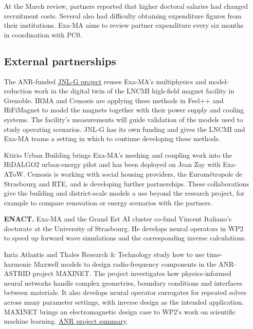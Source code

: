 At the March review, partners reported that higher doctoral salaries
had changed recruitment costs. Several also had difficulty obtaining
expenditure figures from their institutions. Exa-MA aims to review
partner expenditure every six months in coordination with PC0.

\subsection{External partnerships}

The ANR-funded \href{https://anr.fr/Project-ANR-25-CE46-1157}{JNL-G project}
reuses Exa-MA's multiphysics and model-reduction work in the digital
twin of the LNCMI high-field magnet facility in Grenoble. IRMA and
Cemosis are applying these methods in Feel++ and HiFiMagnet to model
the magnets together with their power supply and cooling systems.
The facility's measurements will guide validation of the models used
to study operating scenarios. JNL-G has its own funding and gives the
LNCMI and Exa-MA teams a setting in which to continue developing these methods.

Ktirio Urban Building brings Exa-MA's meshing and coupling work into
the HiDALGO2 urban-energy pilot and has been deployed on Jean Zay with
Exa-AToW. Cemosis is working with social housing providers, the
Eurométropole de Strasbourg and RTE, and is developing further
partnerships. These collaborations give the building and district-scale
models a use beyond the research project, for example to compare
renovation or energy scenarios with the partners.

\textbf{ENACT.} Exa-MA and the Grand Est AI cluster co-fund Vincent Italiano's
doctorate at the University of Strasbourg. He develops neural operators in WP2
to speed up forward wave simulations and the corresponding inverse calculations.

Inria Atlantis and Thales Research \& Technology study how to use
time-harmonic Maxwell models to design radio-frequency components in
the ANR-ASTRID project MAXINET. The project investigates how
physics-informed neural networks handle complex geometries, boundary
conditions and interfaces between materials. It also develops neural
operator surrogates for repeated solves across many parameter settings,
with inverse design as the intended application. MAXINET brings an
electromagnetic design case to WP2's work on scientific machine learning.
\href{https://anr.fr/Project-ANR-24-ASTR-0005}{ANR project summary}.

